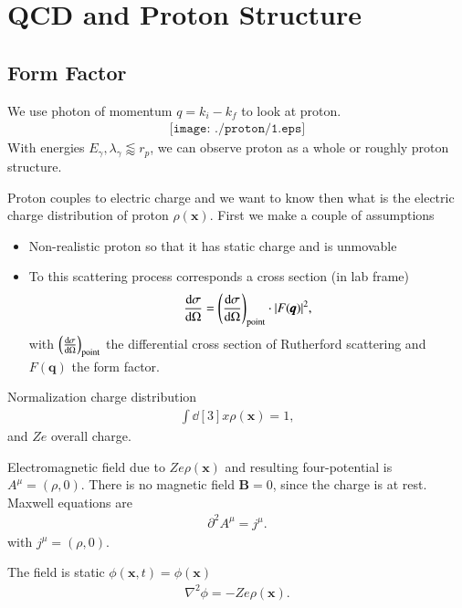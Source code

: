 \chapter{QCD and Proton Structure}
\section{Form Factor}
We use photon of momentum $q = k_i - k_f$ to look at proton.
\begin{align*}
   \texttt{[image: ./proton/1.eps]}   
\end{align*}
With energies $E_\gamma, \lambda_\gamma \lessapprox r_{p}$, we can observe proton as a whole or roughly proton structure.

Proton couples to electric charge and we want to know then what is the electric charge distribution of proton $\rho(\pmb{x})$. First we make a couple of assumptions
\begin{itemize}
   \item Non-realistic proton so that it has static charge and is unmovable 
   \item To this scattering process corresponds a cross section (in lab frame)
      \begin{align}
         \dv{\sigma}{\Omega} = \left( \dv{\sigma}{\Omega} \right)_\text{point} \cdot |F(\pmb q)|^2,
      \end{align}
      with $\left( \dv{\sigma}{\Omega} \right)_\text{point}$ the differential cross section of Rutherford scattering and $F(\pmb{q})$ the form factor.
\end{itemize}

Normalization charge distribution 
\begin{align*}
   \int \dd[3]{x} \rho( \pmb x) = 1,
\end{align*}
and $Ze$ overall charge.

Electromagnetic field due to $Ze \rho(\pmb{x})$ and resulting four-potential is $A^\mu = (\rho, 0)$. There is no magnetic field $\pmb{B} = 0$, since the charge is at rest. 
Maxwell equations are
\begin{align*}
   \partial^2 A ^\mu = j^\mu. 
\end{align*}
with  $j^\mu = (\rho, 0)$.

The field is static $\phi(\pmb{x}, t) = \phi(\pmb x)$
\begin{align*}
   \nabla^2 \phi = - Ze \rho(\pmb x).
\end{align*}

